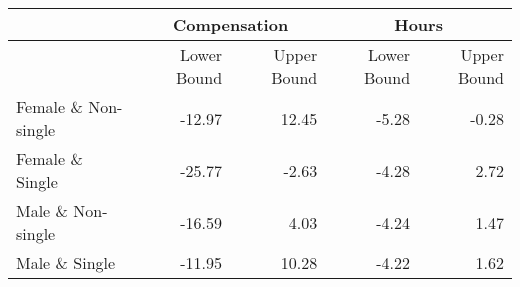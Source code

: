 
\begin{tabular}{l|r|r|r|r}
\hline & \multicolumn{2}{c|}{Compensation} & \multicolumn{2}{|c}{Hours} \\ \hline
  & Lower Bound & Upper Bound & Lower Bound & Upper Bound\\
\hline
Female \& Non-single & -12.97 & 12.45 & -5.28 & -0.28\\
\hline
Female \& Single & -25.77 & -2.63 & -4.28 & 2.72\\
\hline
Male \& Non-single & -16.59 & 4.03 & -4.24 & 1.47\\
\hline
Male \& Single & -11.95 & 10.28 & -4.22 & 1.62\\
\hline
\end{tabular}
